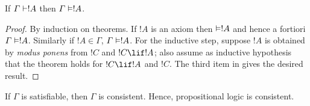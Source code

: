 \documentclass[../../../include/open-logic-section]{subfiles}
\begin{document}


\begin{thm}[Soundness] 
If $\Gamma\Proves!A$ then
$\Gamma \Entails !A$. 
\end{thm}

\begin{proof} 
By induction on theorems. If $!A$ is an axiom then $\Entails
!A$ and hence a fortiori $\Gamma \Entails!A$. Similarly if $!A \in \Gamma$,
$\Gamma \Entails!A$. For the inductive step, suppose $!A$ is obtained by
\emph{modus ponens} from $!C$ and $!C\lif!A$; also assume as inductive
hypothesis that the theorem holds for $!C\lif !A$ and $!C$. The third item
in  gives the desired result. 
\end{proof}

\begin{cor} 
If $\Gamma$ is satisfiable, then $\Gamma$ is consistent. Hence,
propositional logic is consistent. 
\end{cor}
\end{document}
